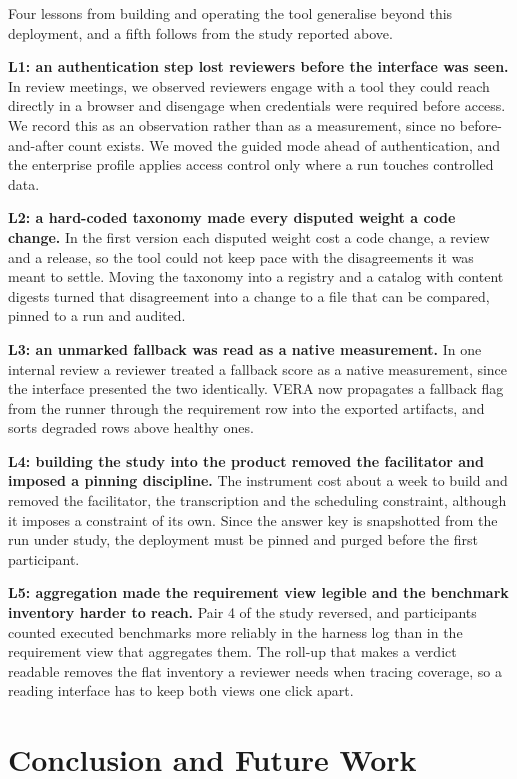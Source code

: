 \documentclass[10pt,conference,a4paper]{IEEEtran}
\begin{document}
Four lessons from building and operating the tool generalise beyond this deployment, and a fifth follows from the study reported above.

\textbf{L1: an authentication step lost reviewers before the interface was seen.}
In review meetings, we observed reviewers engage with a tool they could reach directly in a browser and disengage when credentials were required before access.
We record this as an observation rather than as a measurement, since no before-and-after count exists.
We moved the guided mode ahead of authentication, and the enterprise profile applies access control only where a run touches controlled data.

\textbf{L2: a hard-coded taxonomy made every disputed weight a code change.}
In the first version each disputed weight cost a code change, a review and a release, so the tool could not keep pace with the disagreements it was meant to settle.
Moving the taxonomy into a registry and a catalog with content digests turned that disagreement into a change to a file that can be compared, pinned to a run and audited.

\textbf{L3: an unmarked fallback was read as a native measurement.}
In one internal review a reviewer treated a fallback score as a native measurement, since the interface presented the two identically.
VERA now propagates a fallback flag from the runner through the requirement row into the exported artifacts, and sorts degraded rows above healthy ones.

\textbf{L4: building the study into the product removed the facilitator and imposed a pinning discipline.}
The instrument cost about a week to build and removed the facilitator, the transcription and the scheduling constraint, although it imposes a constraint of its own.
Since the answer key is snapshotted from the run under study, the deployment must be pinned and purged before the first participant.

\textbf{L5: aggregation made the requirement view legible and the benchmark inventory harder to reach.}
Pair 4 of the study reversed, and participants counted executed benchmarks more reliably in the harness log than in the requirement view that aggregates them.
The roll-up that makes a verdict readable removes the flat inventory a reviewer needs when tracing coverage, so a reading interface has to keep both views one click apart.


\section{Conclusion and Future Work}
\label{sec:conclusion}
\end{document}
